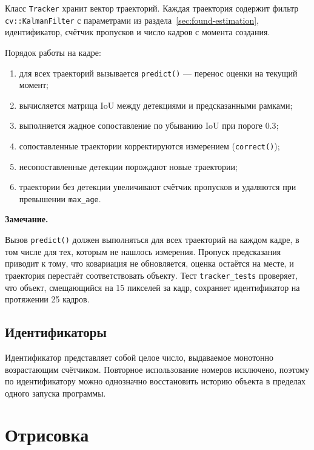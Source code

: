 \documentclass[11pt,a4paper]{article}
\theoremstyle{definition}
\theoremstyle{remark}
\newenvironment{note}
  {\par\medskip\noindent
   \begin{lrbox}{\notebox}%
   \begin{minipage}{0.93\linewidth}%
   \small\textbf{Замечание.}\par\vspace{1pt}\noindent\ignorespaces}
  {\end{minipage}%
   \end{lrbox}%
   \fboxsep=6pt\relax
   \colorbox{codebg}{\usebox{\notebox}}%
   \par\medskip}
\begin{document}
Класс \texttt{Tracker} хранит вектор траекторий. Каждая траектория содержит
фильтр \texttt{cv::KalmanFilter} с параметрами из
раздела~\ref{sec:found-estimation}, идентификатор, счётчик пропусков и число
кадров с момента создания.

Порядок работы на кадре:

\begin{enumerate}
  \item для всех траекторий вызывается \texttt{predict()} --- перенос оценки
        на текущий момент;
  \item вычисляется матрица $\mathrm{IoU}$ между детекциями и
        предсказанными рамками;
  \item выполняется жадное сопоставление по убыванию $\mathrm{IoU}$ при
        пороге $0.3$;
  \item сопоставленные траектории корректируются измерением
        (\texttt{correct()});
  \item несопоставленные детекции порождают новые траектории;
  \item траектории без детекции увеличивают счётчик пропусков и удаляются при
        превышении \texttt{max\_age}.
\end{enumerate}

\begin{note}
Вызов \texttt{predict()} должен выполняться для всех траекторий на каждом
кадре, в том числе для тех, которым не нашлось измерения. Пропуск
предсказания приводит к тому, что ковариация не обновляется, оценка остаётся
на месте, и траектория перестаёт соответствовать объекту. Тест
\texttt{tracker\_tests} проверяет, что объект, смещающийся на 15 пикселей за
кадр, сохраняет идентификатор на протяжении 25 кадров.
\end{note}

\subsection{Идентификаторы}

Идентификатор представляет собой целое число, выдаваемое монотонно
возрастающим счётчиком. Повторное использование номеров исключено, поэтому по
идентификатору можно однозначно восстановить историю объекта в пределах
одного запуска программы.

\section{Отрисовка}
\label{sec:render}
\end{document}
